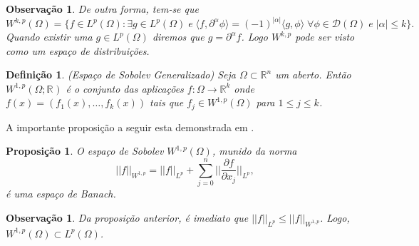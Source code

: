 \documentclass[12pt]{book}
\newtheorem{definicao}[teorema]{Definição}
\newtheorem{observacao}[teorema]{Observação}
\newtheorem{proposicao}[teorema]{Proposição}
\newcommand{\derivadaparcial}[2]{\frac{\partial #1}{\partial #2}}
\newcommand{\espacoLp}[1]{L^{p}(#1)}
\newcommand{\espacoLpGeral}[2]{L^{#1}(#2)}
\newcommand{\espacosobolev}[1]{W^{1,p}(#1)}
\newcommand{\espacosobolevcontradominio}[2]{W^{1,p}(#1;#2)}
\newcommand{\funcoesteste}{\mathcal{D}(\Omega)}
\newcommand{\normagrande}[1]{\Big|\Big|#1\Big|\Big|}
\newcommand{\normaLp}[1]{||#1||_{L^{p}}}
\newcommand{\normaWp}[1]{||#1||_{W^{1,p}}}
\newcommand{\produtointerno}[2]{\langle #1, #2 \rangle}
\newcommand{\real}[1]{\mathbb{R}^{#1}}
\newcommand{\reta}{\real{}}
\begin{document}
	\begin{observacao}\label{observacao_espacos_sobolev_distribuicao}
		De outra forma, tem-se que
		$$
		W^{k,p} (\Omega)	= \{ f\in \espacoLp{\Omega}: \exists g \in \espacoLp{\Omega} \; e \;\produtointerno{f}{\partial^{\alpha}\phi} = (-1)^{|\alpha|}\produtointerno{g}{\phi}\; \forall \phi \in \funcoesteste \; e\; |\alpha|\leq k\}.
		$$
		Quando existir uma $g \in \espacoLpGeral{p}{\Omega}$ diremos que $g = \partial^{\alpha}f$. Logo $W^{k,p}$ pode ser visto como um espaço de distribuições.
	\end{observacao}
	
	\begin{definicao}\label{definicao_espalo_sobolev_generalizado}
		(Espaço de Sobolev Generalizado) Seja $\Omega\subset \real{n}$ um aberto. Então $\espacosobolevcontradominio{\Omega}{\reta}$ é o conjunto das aplicações  $f:\Omega \to \real{k}$ onde $f(x) = (f_{1}(x), \dots, f_{k}(x))$ tais que $f_{j} \in \espacosobolev{\Omega} $ para $1\leq j \leq k$.
	\end{definicao}
	
	A importante proposição a seguir esta demonstrada em \cite{breazis_sobolev_spaces}.
	
	\begin{proposicao}
		O espaço de Sobolev $\espacosobolev{\Omega}$, munido da norma 
		$$
		\normaWp{f} = \normaLp{f}+\sum_{j=0}^{n}\normagrande{\derivadaparcial{f}{x_{j}}}_{L^{p}},
		$$
		é uma espaço de Banach.
	\end{proposicao}
	
	\begin{observacao}
		Da proposição anterior, é imediato que $\normaLp{f} \leq \normaWp{f}$. Logo, $\espacosobolev{\Omega} \subset\espacoLp{\Omega}$.
	\end{observacao}
	
\end{document}
